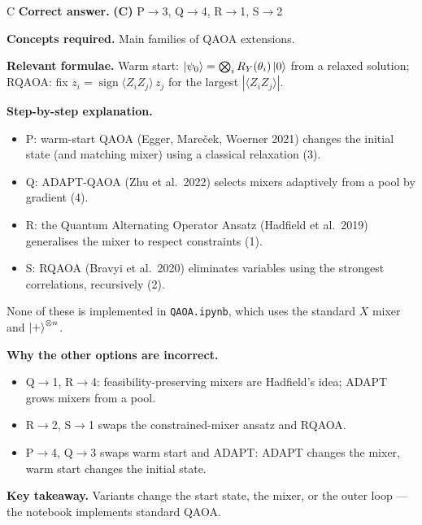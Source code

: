 \documentclass[11pt,a4paper]{article}
\newcommand{\qsep}{\par\vspace{2pt}{\color{black!15}\hrule}\vspace{4pt}}
\begin{document}
\begin{solbox}{C}
\textbf{\color{brand}Correct answer.} \textcolor{okgreen}{\textbf{(C)}} P$\to$3, Q$\to$4, R$\to$1, S$\to$2

\textbf{\color{brand}Concepts required.} Main families of QAOA extensions.

\textbf{\color{brand}Relevant formulae.} Warm start: $\ket{\psi_0} = \bigotimes_i R_Y(\theta_i)\ket0$ from a relaxed solution; RQAOA: fix $z_i = \operatorname{sign}\langle Z_iZ_j\rangle\,z_j$ for the largest $|\langle Z_iZ_j\rangle|$.

\textbf{\color{brand}Step-by-step explanation.} \begin{itemize}\itemsep0pt
\item P: warm-start QAOA (Egger, Mare\v{c}ek, Woerner 2021) changes the initial state (and matching mixer) using a classical relaxation (3).
\item Q: ADAPT-QAOA (Zhu et al.\ 2022) selects mixers adaptively from a pool by gradient (4).
\item R: the Quantum Alternating Operator Ansatz (Hadfield et al.\ 2019) generalises the mixer to respect constraints (1).
\item S: RQAOA (Bravyi et al.\ 2020) eliminates variables using the strongest correlations, recursively (2).
\end{itemize}
None of these is implemented in \texttt{QAOA.ipynb}, which uses the standard $X$ mixer and $\ket+^{\otimes n}$.

\textbf{\color{brand}Why the other options are incorrect.}
\begin{itemize}[leftmargin=2.4em, itemsep=1pt, topsep=2pt]
\item[\textbf{(A)}] Q$\to$1, R$\to$4: feasibility-preserving mixers are Hadfield's idea; ADAPT grows mixers from a pool.
\item[\textbf{(B)}] R$\to$2, S$\to$1 swaps the constrained-mixer ansatz and RQAOA.
\item[\textbf{(D)}] P$\to$4, Q$\to$3 swaps warm start and ADAPT: ADAPT changes the mixer, warm start changes the initial state.
\end{itemize}
\textbf{\color{brand}Key takeaway.} Variants change the start state, the mixer, or the outer loop --- the notebook implements standard QAOA.
\end{solbox}
\qsep
\end{document}
